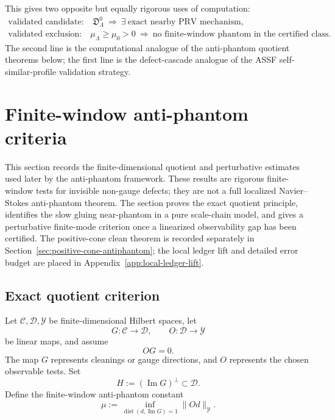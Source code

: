 \documentclass[11pt]{article}
\numberwithin{equation}{section}
\newcommand{\calC}{\mathcal C}
\newcommand{\calD}{\mathcal D}
\newcommand{\calY}{\mathcal Y}
\newcommand{\Image}{\operatorname{Im}}
\newcommand{\Dist}{\operatorname{dist}}
\begin{document}
This gives two opposite but equally rigorous uses of computation:
\[
\boxed{
\begin{array}{c}
\text{validated candidate:}\quad
\mathfrak D_\Lambda^0\ \Longrightarrow\ \exists\ \text{exact nearby PRV mechanism},\\[2mm]
\text{validated exclusion:}\quad
\mu_\Lambda\ge \mu_0>0\ \Longrightarrow\ \text{no finite-window phantom in the certified class}.
\end{array}}
\]
The second line is the computational analogue of the anti-phantom quotient theorems below; the first line is the defect-cascade analogue of the ASSF self-similar-profile validation strategy.


\section{Finite-window anti-phantom criteria}\label{sec:finite-window-antiphantom}
\noindent This section records the finite-dimensional quotient and
perturbative estimates used later by the anti-phantom framework.  These
results are rigorous finite-window tests for invisible non-gauge defects;
they are not a full localized Navier--Stokes anti-phantom theorem.  The
section proves the exact quotient principle, identifies the slow gluing
near-phantom in a pure scale-chain model, and gives a perturbative
finite-mode criterion once a linearized observability gap has been
certified.  The positive-cone clean theorem is recorded separately in
Section~\ref{sec:positive-cone-antiphantom}; the local ledger lift and
detailed error budget are placed in Appendix~\ref{app:local-ledger-lift}.

\subsection{Exact quotient criterion}

Let $\calC,\calD,\calY$ be finite-dimensional Hilbert spaces, let
\[
    G:\calC\to\calD,
    \qquad
    O:\calD\to\calY
\]
be linear maps, and assume
\[
    OG=0.
\]
The map $G$ represents cleanings or gauge directions, and $O$ represents the chosen observable tests.  Set
\[
    H:=(\Image G)^\perp\subset\calD.
\]
Define the finite-window anti-phantom constant
\begin{equation}\label{eq:abstract-mu}
    \mu
    :=
    \inf_{\Dist(d,\Image G)=1}\|Od\|_{\calY}.
\end{equation}
\end{document}
